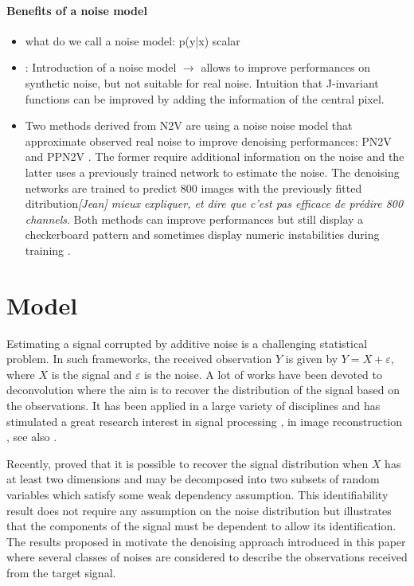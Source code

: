 \documentclass{article}
\begin{document}
\paragraph{Benefits of a noise model}
\begin{itemize}
\item what do we call a noise model: p(y|x) scalar
\item \cite{laine2019high} : Introduction of a noise model $\rightarrow$ allows to improve performances on synthetic noise, but not suitable for real noise. Intuition that J-invariant functions can be improved by adding the information of the central pixel.
\item Two methods derived from N2V are using a noise noise model that approximate observed real noise to improve denoising performances: PN2V \cite{krull2019probabilistic} and PPN2V \cite{prakash2020fully}. The former require additional information on the noise and the latter uses a previously trained network to estimate the noise. The denoising networks are trained to predict 800 images with the previously fitted ditribution\textit{[Jean] mieux expliquer, et dire que c'est pas efficace de prédire 800 channels}.
Both methods can improve performances but still display a checkerboard pattern and sometimes display numeric instabilities during training \cite{2020DivNoising}.

\end{itemize}

\section{Model}
\label{sec:model}


Estimating a signal corrupted by additive noise  is a challenging statistical problem. In such frameworks, the received observation $Y$ is given by $Y = X + \varepsilon$,  where $X$ is the signal and $\varepsilon$ is the noise. A lot of works have been devoted to deconvolution where the aim is to recover the distribution of the signal based on the observations. It has been applied in a large variety of disciplines and has stimulated a great research interest in signal processing \cite{moulines1997maximum,attias1998blind}, in image reconstruction \cite{kundur1996blind,campisi2017blind}, see also  \cite{meister:2009}. 


Recently, \cite{gassiat:lecorff:lehericy:2021} proved that it is possible to recover the signal distribution when $X$ has at least two dimensions and may be decomposed into two subsets of random variables which satisfy some weak dependency assumption. This identifiability result does not require any assumption on the noise distribution but illustrates that the components of the signal must be dependent to allow its identification. The results proposed in \cite{gassiat:lecorff:lehericy:2021} motivate the denoising approach introduced in this paper where several classes of noises are considered to describe the observations received from the target signal.  %
\end{document}
